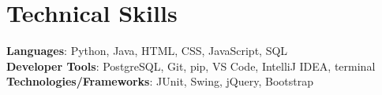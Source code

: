 \documentclass[letterpaper,11pt]{article}
\begin{document}
\section{Technical Skills}
 \begin{itemize}[leftmargin=0.15in, label={}]
    \small{\item{
     \textbf{Languages}{: Python, Java, HTML, CSS, JavaScript, SQL} \\
     \textbf{Developer Tools}{: PostgreSQL, Git, pip, VS Code, IntelliJ IDEA, terminal } \\
     \textbf{Technologies/Frameworks}{: JUnit, Swing, jQuery, Bootstrap} \\
    }}
 \end{itemize}
 \vspace{-16pt}

\end{document}

